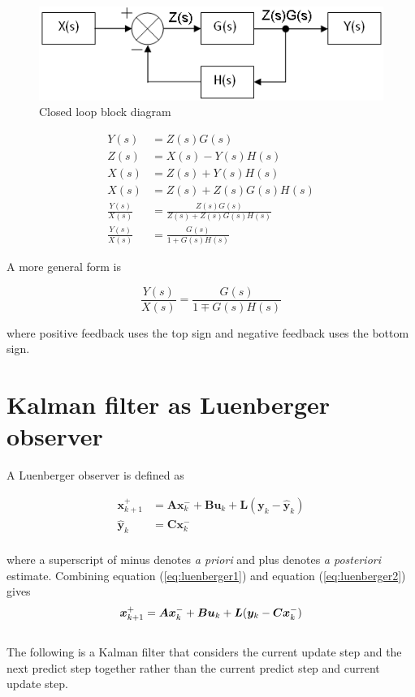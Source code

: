 \documentclass[10pt,conference,compsoc]{IEEEtran}
\newcommand{\mtx}[1] {\bm #1}
\begin{document}
\begin{figure}[H]
  \includegraphics[width=\linewidth]{figs/Closed_Loop_Block_Deriv.png}
  \caption{Closed loop block diagram \cite{bib:closed_loop_block_derivation}}
  \label{fig:closed_loop_deriv}
\end{figure}

\begin{align}
  Y(s) &= Z(s) G(s) \nonumber \\
  Z(s) &= X(s) - Y(s) H(s) \nonumber \\
  X(s) &= Z(s) + Y(s) H(s) \nonumber \\
  X(s) &= Z(s) + Z(s) G(s) H(s) \nonumber \\
  \frac{Y(s)}{X(s)} &= \frac{Z(s) G(s)}{Z(s) + Z(s) G(s) H(s)} \nonumber \\
  \frac{Y(s)}{X(s)} &= \frac{G(s)}{1 + G(s) H(s)}
\end{align}

\noindent A more general form is

\begin{equation}
  \frac{Y(s)}{X(s)} = \frac{G(s)}{1 \mp G(s) H(s)}
\end{equation}

\noindent where positive feedback uses the top sign and negative feedback uses
the bottom sign.

\section{Kalman filter as Luenberger observer} \label{sec:app_kalman_luenberger}

\noindent A Luenberger observer is defined as

\begin{align}
  \mtx{x}_{k+1}^+ &= \mtx{A} \mtx{x}_k^- + \mtx{B} \mtx{u}_k + \mtx{L}
    (\mtx{y}_k - \hat{\mtx{y}}_k) \label{eq:luenberger1} \\
  \hat{\mtx{y}}_k &= \mtx{C} \mtx{x}_k^- \label{eq:luenberger2} \\ \nonumber
\end{align}

\noindent where a superscript of minus denotes \textit{a priori} and plus
denotes \textit{a posteriori} estimate. Combining equation
(\ref{eq:luenberger1}) and equation (\ref{eq:luenberger2}) gives \\
\begin{equation} \label{eq:luenberger}
  \mtx{x}_{k+1}^+ = \mtx{A} \mtx{x}_k^- + \mtx{B} \mtx{u}_k + \mtx{L}
    (\mtx{y}_k - \mtx{C} \mtx{x}_k^-) \\
\end{equation}
\\
\noindent The following is a Kalman filter that considers the current update
step and the next predict step together rather than the current predict step and
current update step.
\end{document}
